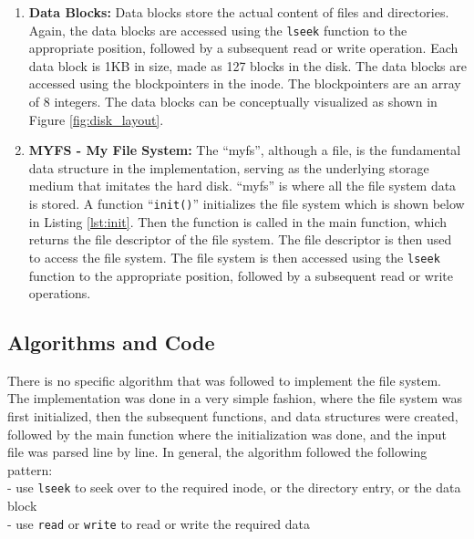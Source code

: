 \documentclass{article}
\theoremstyle{mytheoremstyle}
\theoremstyle{mytheoremstyle}
\theoremstyle{myproblemstyle}
\begin{document}
\begin{enumerate}
    \item \textbf{Data Blocks:} Data blocks store the actual content of files and directories. Again, the data blocks are accessed using the \texttt{lseek} function to the appropriate position, followed by a subsequent read or write operation. Each data block is 1KB in size, made as 127 blocks in the disk. The data blocks are accessed using the blockpointers in the inode. The blockpointers are an array of 8 integers. The data blocks can be conceptually visualized as shown in Figure \ref{fig:disk_layout}.
    
    \item \textbf{MYFS - My File System:} The ``myfs'', although a file, is the fundamental data structure in the implementation, serving as the underlying storage medium that imitates the hard disk. ``myfs'' is where all the file system data is stored. A function ``\texttt{init()}'' initializes the file system which is shown below in Listing \ref{lst:init}. Then the function is called in the main function, which returns the file descriptor of the file system. The file descriptor is then used to access the file system. The file system is then accessed using the \texttt{lseek} function to the appropriate position, followed by a subsequent read or write operations.
\end{enumerate}

\newpage
\subsection{Algorithms and Code}

There is no specific algorithm that was followed to implement the file system. The implementation was done in a very simple fashion, where the file system was first initialized, then the subsequent functions, and data structures were created, followed by the main function where the initialization was done, and the input file was parsed line by line. In general, the algorithm followed the following pattern: \\ 
\hspace*{5mm} - use \texttt{lseek} to seek over to the required inode, or the directory entry, or the data block \\
\hspace*{5mm} - use \texttt{read} or \texttt{write} to read or write the required data
\end{document}
